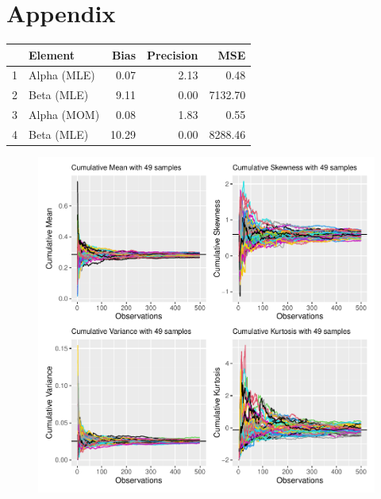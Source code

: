 \documentclass{article}\usepackage[]{graphicx}\usepackage[]{xcolor}
\begin{document}
\section{Appendix}
\begin{table}[ht]
\centering
\begin{tabular}{rlrrr}
  \hline
 & Element & Bias & Precision & MSE \\ 
  \hline
1 & Alpha (MLE) & 0.07 & 2.13 & 0.48 \\ 
  2 & Beta (MLE) & 9.11 & 0.00 & 7132.70 \\ 
  3 & Alpha (MOM) & 0.08 & 1.83 & 0.55 \\ 
  4 & Beta (MLE) & 10.29 & 0.00 & 8288.46 \\ 
   \hline
\end{tabular}
\end{table}
\begin{figure}[H]
    \begin{center}
       \includegraphics[scale=0.5]{cumStats.pdf}

\end{center}
\end{figure}
\end{document}
